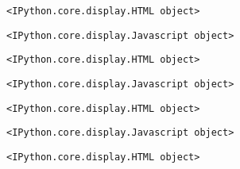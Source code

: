 \documentclass[11pt]{article}
\begin{document}
    
    
    \begin{verbatim}
<IPython.core.display.HTML object>
    \end{verbatim}

    
    
    \begin{verbatim}
<IPython.core.display.Javascript object>
    \end{verbatim}

    
    
    \begin{verbatim}
<IPython.core.display.HTML object>
    \end{verbatim}

    
    
    \begin{verbatim}
<IPython.core.display.Javascript object>
    \end{verbatim}

    
    
    \begin{verbatim}
<IPython.core.display.HTML object>
    \end{verbatim}

    
    
    \begin{verbatim}
<IPython.core.display.Javascript object>
    \end{verbatim}

    
    
    \begin{verbatim}
<IPython.core.display.HTML object>
    \end{verbatim}
\end{document}
